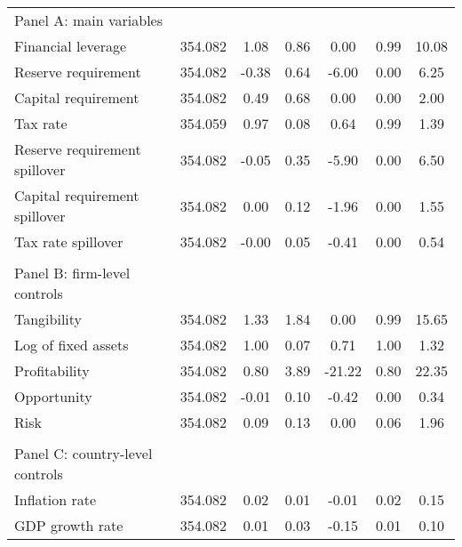 \begin{longtable}{lcccccc}
	Panel A: main variables         &      &        &        &        &       \\
\quad Financial leverage  &      354.082&        1.08&        0.86&        0.00&        0.99&       10.08\\
\quad Reserve requirement &      354.082&       -0.38&        0.64&       -6.00&        0.00&        6.25\\
\quad Capital requirement &      354.082&        0.49&        0.68&        0.00&        0.00&        2.00\\
\quad Tax rate         &      354.059&        0.97&        0.08&        0.64&        0.99&        1.39\\
\quad Reserve requirement spillover&      354.082&       -0.05&        0.35&       -5.90&        0.00&        6.50\\
\quad Capital requirement spillover&      354.082&        0.00&        0.12&       -1.96&        0.00&        1.55\\
\quad  Tax rate spillover          &      354.082&       -0.00&        0.05&       -0.41&        0.00&        0.54\\
          &      &        &        &        &       \\
 Panel B: firm-level controls         &      &        &        &        &       \\
\quad Tangibility         &      354.082&        1.33&        1.84&        0.00&        0.99&       15.65\\
\quad Log of fixed assets &      354.082&        1.00&        0.07&        0.71&        1.00&        1.32\\
\quad Profitability       &      354.082&        0.80&        3.89&      -21.22&        0.80&       22.35\\
\quad Opportunity         &      354.082&       -0.01&        0.10&       -0.42&        0.00&        0.34\\
\quad Risk                &      354.082&        0.09&        0.13&        0.00&        0.06&        1.96\\
         &      &        &        &        &       \\
Panel C: country-level controls         &      &        &        &        &       \\
\quad Inflation rate      &      354.082&        0.02&        0.01&       -0.01&        0.02&        0.15\\
\quad GDP growth rate     &      354.082&        0.01&        0.03&       -0.15&        0.01&        0.10\\

\end{longtable}

